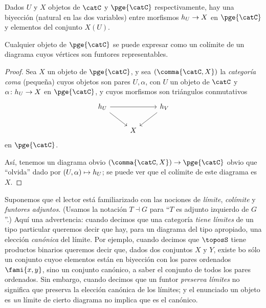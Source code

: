 \begin{lemma}[label={0.11},note={Yoneda \pend{[187]}},short-note={Yoneda}]
  Dados \(U\) y \(X\) objetos de \(\catC\) y \(\pge{\catC}\) respectivamente,
  hay una biyección (natural en las dos variables) entre morfismos \(h_U\to X\)
  en \(\pge{\catC}\) y elementos del conjunto \(X(U)\).
\end{lemma}

\begin{lemma}
  Cualquier objeto de \(\pge{\catC}\) se puede expresar como un colímite de un
  diagrama cuyos vértices son funtores representables.
\end{lemma}
\begin{proof}
  Sea \(X\) un objeto de \(\pge{\catC}\), y sea \((\comma{\catC,X})\) la
  \emph{categoría coma} (pequeña) cuyos objetos son pares \(U,\alpha\), con
  \(U\) un objeto de \(\catC\) y \(\alpha\colon h_U \to X\) en \(\pge{\catC}\),
  y cuyos morfismos son triángulos conmutativos
  \begin{equation*}
    \begin{tikzcd}
      \gy_U \ar{rr}\ar{rd} && \gy_V\ar{ld} \\
      & X
    \end{tikzcd}
  \end{equation*}
  en \(\pge{\catC}\).

  Así, tenemos un diagrama obvio \((\comma{\catC,X})\to\pge{\catC}\) obvio que
  \enquote{olvida} dado por \((U,\alpha)\mapsto h_U\); se puede ver que el
  colímite de este diagrama es \(X\).
\end{proof}

Suponemos que el lector está familiarizado con las nociones de \emph{límite},
\emph{colímite} y \emph{funtores adjuntos}. (Usamos la notación \(T\dashv G\)
para \enquote{\(T\) es adjunto izquierdo de \(G\)}.) Aquí una advertencia:
cuando decimos que una categoría \emph{tiene límites} de un tipo particular
queremos decir que hay, para un diagrama del tipo apropiado, una elección
\emph{canónica} del límite. Por ejemplo, cuando decimos que \(\con\) tiene
productos binarios queremos decir que, dados dos conjuntos \(X\) y \(Y\), existe
bo sólo un conjunto cuyoe elementos están en biyección con los pares ordenados
\(\fami{x,y}\), sino un conjunto canónico, a saber el conjunto de todos los
pares ordenados. Sin embargo, cuando decimos que un funtor \emph{preserva
límites} no significa que preserva la elección canónica de los límites; y el
enunciado un objeto es \emph{un} límite de cierto diagrama no implica que es el
canónico.

